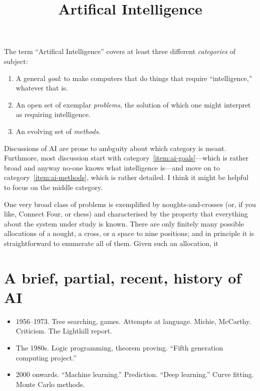 \documentclass[10pt, a4paper, twocolumn]{article}
\title{Artifical Intelligence}
\begin{document}
\maketitle

The term ``Artifical Intelligence'' covers at least three different
\emph{categories} of subject:
\begin{enumerate}
\item\label{item:ai-goals} A general \emph{goal}: to make computers that do
  things that require ``intelligence,'' whatever that is. 
\item\label{item:ai-problems} An open set of exemplar \emph{problems}, the
  solution of which one might interpret as requiring intelligence.
\item\label{item:ai-methods} An evolving set of \emph{methods}.
\end{enumerate}

Discussions of AI are prone to ambguity about which category is
meant. Furthmore, most discussion start with category~\ref{item:ai-goals}---which
is rather broad and anyway no-one knows what intelligence is---and move on to
category~\ref{item:ai-methods}, which is rather detailed. I think it might be
helpful to focus on the middle category.

One very broad class of problems is exemplified by noughts-and-crosses (or, if
you like, Connect Four, or chess) and characterised by the property that
everything about the system under study is known. There are only finitely many
possible allocations of a nought, a cross, or a space to nine positions; and in
principle it is straightforward to enumerate all of them. Given such an
allocation, it



\section{A brief, partial, recent, history of AI}

\begin{itemize}
\item 1956–1973. Tree searching, games. Attempts at language. Michie,
  McCarthy. Criticism. The Lighthill report. 
\item The 1980s. Logic programming, theorem proving. ``Fifth generation
  computing project.'' 
\item 2000 onwards. ``Machine learning.'' Prediction. ``Deep learning.'' Curve
  fitting. Monte Carlo methods.
\end{itemize}
\end{document}
